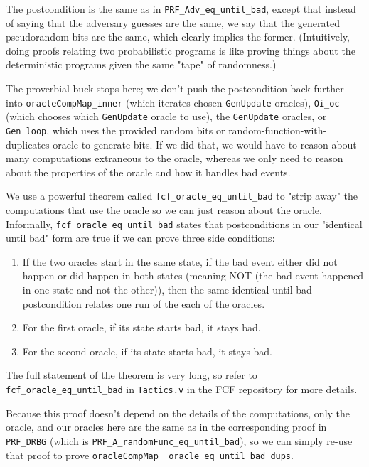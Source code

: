 \documentclass[12pt,lot, lof]{puthesis}
\newcommand{\li} {\lstinline}
\begin{document}
{%
The postcondition is the same as in \li|PRF_Adv_eq_until_bad|, except that instead of saying that the adversary guesses are the same, we say that the generated pseudorandom bits are the same, which clearly implies the former. (Intuitively, doing proofs relating two probabilistic programs is like proving things about the deterministic programs given the same "tape" of randomness.) 

The proverbial buck stops here; we don't push the postcondition back further into \li|oracleCompMap_inner| (which iterates chosen \li|GenUpdate| oracles), \li|Oi_oc| (which chooses which \li|GenUpdate| oracle to use), the \li|GenUpdate| oracles, or \li|Gen_loop|, which uses the provided random bits or random-function-with-duplicates oracle to generate bits. If we did that, we would have to reason about many computations extraneous to the oracle, whereas we only need to reason about the properties of the oracle and how it handles bad events.

We use a powerful theorem called \li|fcf_oracle_eq_until_bad| to "strip away" the computations that use the oracle so we can just reason about the oracle. Informally, \li|fcf_oracle_eq_until_bad| states that postconditions in our "identical until bad" form are true if we can prove three side conditions:

\begin{enumerate}
\item If the two oracles start in the same state, if the bad event either did not happen or did happen in both states (meaning NOT (the bad event happened in one state and not the other)), then the same identical-until-bad postcondition relates one run of the each of the oracles.

\item For the first oracle, if its state starts bad, it stays bad.

\item For the second oracle, if its state starts bad, it stays bad.

\end{enumerate}

The full statement of the theorem is very long, so refer to \li|fcf_oracle_eq_until_bad| in \li|Tactics.v| in the FCF repository for more details.


Because this proof doesn't depend on the details of the computations, only the oracle, and our oracles here are the same as in the corresponding proof in \li|PRF_DRBG| (which is \li|PRF_A_randomFunc_eq_until_bad|), so we can simply re-use that proof to prove \li|oracleCompMap__oracle_eq_until_bad_dups|.

}
\end{document}
